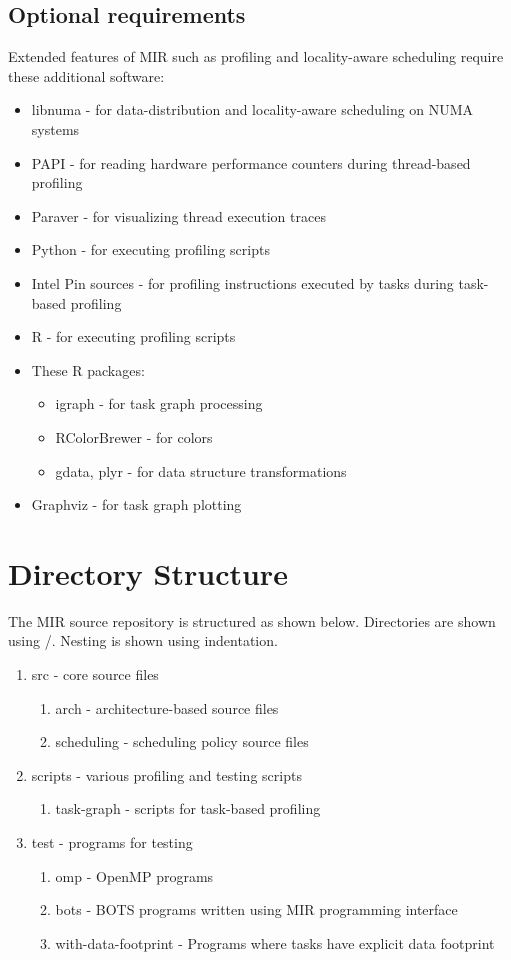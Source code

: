 \documentclass[11pt,a4paper,notitlepage]{article}
\begin{document}
\subsection{Optional requirements}
Extended features of MIR such as profiling and locality-aware scheduling require these additional software:
\begin{itemize}
\item libnuma - for data-distribution and locality-aware scheduling on NUMA systems
\item PAPI - for reading hardware performance counters during thread-based profiling
\item Paraver - for visualizing thread execution traces
\item Python - for executing profiling scripts
\item Intel Pin sources - for profiling instructions executed by tasks during task-based profiling
\item R - for executing profiling scripts
\item These R packages: 
\begin{itemize}
\item igraph - for task graph processing
\item RColorBrewer - for colors
\item gdata, plyr - for data structure transformations
\end{itemize}
\item Graphviz - for task graph plotting
\end{itemize}

\section{Directory Structure}
The MIR source repository is structured as shown below. Directories are shown using /. Nesting is shown using indentation.
\begin{enumerate}[/]
\item src - core source files
    \begin{enumerate}[/]
        \item arch - architecture-based source files
        \item scheduling - scheduling policy source files
    \end{enumerate}
\item scripts - various profiling and testing scripts
    \begin{enumerate}[/]
        \item task-graph - scripts for task-based profiling
    \end{enumerate}
\item test - programs for testing 
    \begin{enumerate}[/]
        \item omp - OpenMP programs
        \item bots - BOTS programs written using MIR programming interface
        \item with-data-footprint - Programs where tasks have explicit data footprint 
    \end{enumerate}
\end{enumerate}
\end{document}
